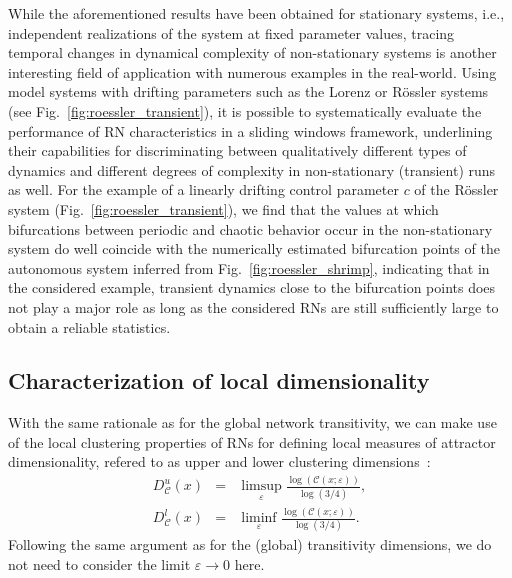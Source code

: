 \documentclass[graybox]{svmult}
\begin{document}
While the aforementioned results have been obtained for stationary systems, i.e., independent realizations of the system at fixed parameter values, tracing temporal changes in dynamical complexity of non-stationary systems is another interesting field of application with numerous examples in the real-world. Using model systems with drifting parameters such as the Lorenz \cite{Donges2011NPG} or R\"ossler systems (see Fig.~\ref{fig:roessler_transient}), it is possible to systematically evaluate the performance of RN characteristics in a sliding windows framework, underlining their capabilities for discriminating between qualitatively different types of dynamics and different degrees of complexity in non-stationary (transient) runs as well. For the example of a linearly drifting control parameter $c$ of the R\"ossler system (Fig.~\ref{fig:roessler_transient}), we find that the values at which bifurcations between periodic and chaotic behavior occur in the non-stationary system do well coincide with the numerically estimated bifurcation points of the autonomous system inferred from Fig.~\ref{fig:roessler_shrimp}, indicating that in the considered example, transient dynamics close to the bifurcation points does not play a major role as long as the considered RNs are still sufficiently large to obtain a reliable statistics.


\subsection{Characterization of local dimensionality}\label{sec:transitivity_local}

With the same rationale as for the global network transitivity, we can make use of the local clustering properties of RNs for defining local measures of attractor dimensionality, refered to as upper and lower clustering dimensions~\cite{Donner2011EPJB}:
\begin{eqnarray}
D_{\mathcal{C}}^u(x) &=& \limsup_{\varepsilon} \frac{\log(\mathcal{C}(x;\varepsilon))}{\log(3/4)}, \\
D_{\mathcal{C}}^l(x) &=& \liminf_{\varepsilon} \frac{\log(\mathcal{C}(x;\varepsilon))}{\log(3/4)}.
\end{eqnarray}
\noindent
Following the same argument as for the (global) transitivity dimensions, we do not need to consider the limit $\varepsilon\to 0$ here.
\end{document}
